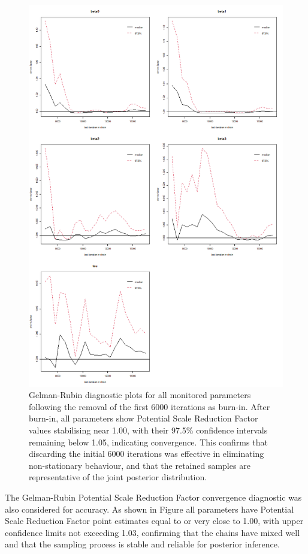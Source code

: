 \documentclass[]{article}
\begin{document}
\begin{figure}[H]
	\centering
	\includegraphics[width=0.7\linewidth]{img/img-gelman-plot-all-bi}
	\caption{Gelman-Rubin diagnostic plots for all monitored parameters following the removal of the first 6000 iterations as burn-in. After burn-in, all parameters show Potential Scale Reduction Factor values stabilising near 1.00, with their 97.5\% confidence intervals remaining below 1.05, indicating convergence. This confirms that discarding the initial 6000 iterations was effective in eliminating non-stationary behaviour, and that the retained samples are representative of the joint posterior distribution.}	\label{fig:img-gelman-plot-all-bi}
\end{figure}


The Gelman-Rubin Potential Scale Reduction Factor convergence diagnostic was also considered for accuracy. As shown in Figure all parameters have Potential Scale Reduction Factor point estimates equal to or very close to 1.00, with upper confidence limits not exceeding 1.03, confirming that the chains have mixed well and that the sampling process is stable and reliable for posterior inference.
\end{document}
